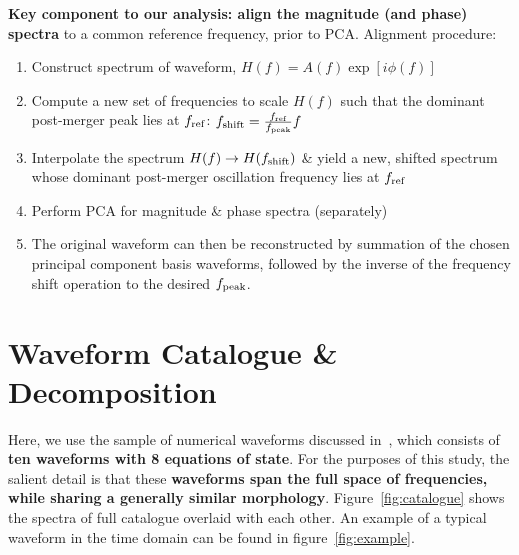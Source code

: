\documentclass[a0,landscape]{a0poster}
\begin{document}
\begin{multicols}{4}
{\bf Key component to our analysis: align the magnitude (and phase) spectra} to
a common reference frequency, prior to PCA.   Alignment procedure:
\begin{enumerate}
    \item Construct spectrum of waveform, $H(f) = A(f)\exp[i\phi(f)]$
    \item Compute a new set of frequencies to scale $H(f)$ such that the
        dominant post-merger peak lies at $f_{\rm ref}$:
            $f_{\rm shift} = \frac{f_{\rm ref}}{f_{\rm peak}}  f$
    \item Interpolate the spectrum $H(f)\rightarrow H(f_{\rm shift})$ \& yield a
        new, shifted spectrum whose dominant post-merger oscillation frequency
        lies at $f_{\rm ref}$
    \item Perform PCA for magnitude \& phase spectra (separately)
    \item The original waveform can then be reconstructed by summation of
        the chosen principal component basis waveforms, followed by the inverse
        of the frequency shift operation to the desired $f_{\rm peak}$.
\end{enumerate}

\section*{\centering Waveform Catalogue \& Decomposition}
Here, we use the sample of numerical waveforms discussed
in~\cite{2014PhRvD..90f2004C},  which consists of {\bf ten waveforms with 8
equations of state}.  For the purposes of this study, the salient detail is that
these {\bf waveforms span the full space of frequencies, while sharing a
generally similar morphology}.  Figure~\ref{fig:catalogue} shows the spectra of
full catalogue overlaid with each other.  An example of a typical waveform in
the time domain can be found in figure~\ref{fig:example}.


\end{multicols}
\end{document}
